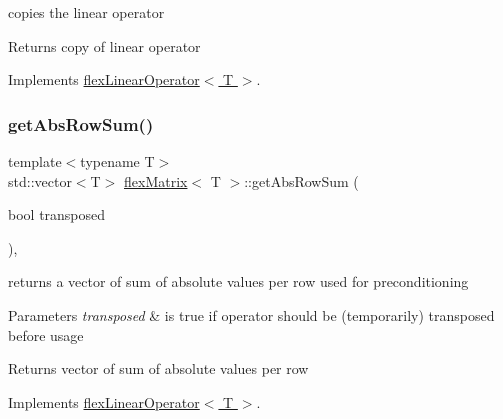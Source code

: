 copies the linear operator 

\begin{DoxyReturn}{Returns}
copy of linear operator 
\end{DoxyReturn}


Implements \hyperlink{classflex_linear_operator_a7cc1425677cc30fcbd092ffd28d508c9}{flex\+Linear\+Operator$<$ T $>$}.

\mbox{\label{classflex_matrix_a75f378787fc81ea2c570c9848a7f2588}} 
\subsubsection{\texorpdfstring{get\+Abs\+Row\+Sum()}{getAbsRowSum()}}
{\footnotesize\ttfamily template$<$typename T$>$ \\
std\+::vector$<$T$>$ \hyperlink{classflex_matrix}{flex\+Matrix}$<$ T $>$\+::get\+Abs\+Row\+Sum (\begin{DoxyParamCaption}\item[{bool}]{transposed }\end{DoxyParamCaption})\hspace{0.3cm}{\ttfamily [inline]}, {\ttfamily [virtual]}}



returns a vector of sum of absolute values per row used for preconditioning 


\begin{DoxyParams}{Parameters}
{\em transposed} & is true if operator should be (temporarily) transposed before usage \\
\hline
\end{DoxyParams}
\begin{DoxyReturn}{Returns}
vector of sum of absolute values per row 
\end{DoxyReturn}


Implements \hyperlink{classflex_linear_operator_ad6caa7b09e6e3c401cadef61b8e2307e}{flex\+Linear\+Operator$<$ T $>$}.

\mbox{\label{classflex_matrix_ae713d5dabcdab30df9b04f2a7d499235}} 
